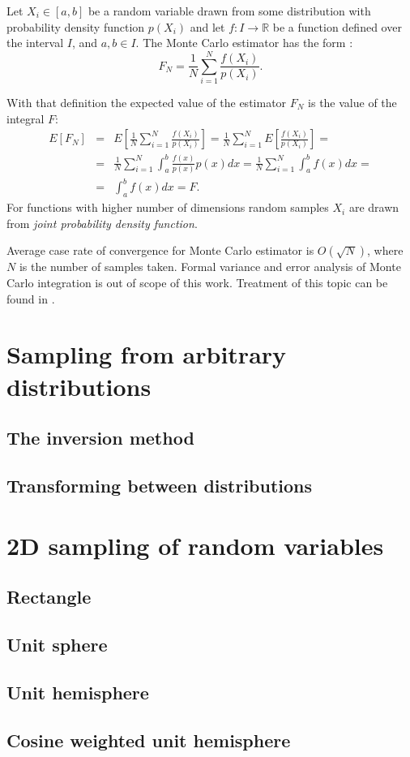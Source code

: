 \begin{df}
  Let $X_{i} \in [a,b]$ be a random variable drawn from some distribution with probability density function $p(X_{i})$ and let $f: I \rightarrow \mathbb{R}$ be a function defined over the interval $I$, and $a,b \in I$. The Monte Carlo estimator has the form \parencite{veach97}:
\begin{equation}
  F_{N} = \frac{1}{N} \sum_{i=1}^{N} \frac{f(X_{i})}{p(X_{i})}.
\end{equation}
\end{df}
With that definition the expected value of the estimator $F_{N}$ is the value of the integral $F$:
\begin{eqnarray}
  E[F_{N}] &=& E\left[ \frac{1}{N} \sum_{i=1}^{N} \frac{f(X_{i})}{p(X_{i})} \right]
  = \frac{1}{N} \sum_{i=1}^{N} E \left[ \frac{f(X_{i})}{p(X_{i})} \right] = \nonumber \\
  &=& \frac{1}{N} \sum_{i=1}^{N} \int_{a}^{b} \frac{f(x)}{p(x)} p(x) dx
  = \frac{1}{N} \sum_{i=1}^{N} \int_{a}^{b} f(x) dx = \nonumber \\
  &=& \int_{a}^{b} f(x)dx = F.
\end{eqnarray}
For functions with higher number of dimensions random samples $X_{i}$ are drawn from \emph{joint probability density function}.

Average case rate of convergence for Monte Carlo estimator is $O(\sqrt{N})$, where $N$ is the number of samples taken. Formal variance and error analysis of Monte Carlo integration is out of scope of this work. Treatment of this topic can be found in \cite{robert2004}.
\vfill

\section{Sampling from arbitrary distributions}

\subsection{The inversion method}

\subsection{Transforming between distributions}

\section{2D sampling of random variables}

\subsection{Rectangle}

\subsection{Unit sphere}

\subsection{Unit hemisphere}

\subsection{Cosine weighted unit hemisphere}

